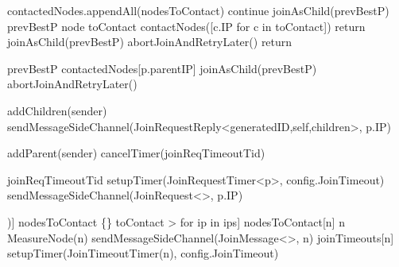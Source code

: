 \begin{algorithm}{}
\begin{algorithmic}[1]
 \label{alg:memb:join:cond_go}
    \State contactedNodes.appendAll(nodesToContact)
         \label{alg:memb:join:verif_children}
            \State continue 
        \EndIf
         \label{alg:memb:join:verif_vs_prev}
            \State joinAsChild(prevBestP)
        \Else
            \State prevBestP \asdassign node \label{alg:memb:join:advance}
            \State toContact 
            \State contactNodes([c.IP for c in toContact])
        \EndIf
        \State return
    \EndFor
    {joinAsChild(prevBestP)}  
    {abortJoinAndRetryLater()} \label{alg:memb:join:join_base_case}
    \State return
\asdend

 \label{alg:memb:join:exclusions}
\asdend

            \State prevBestP \asdassign contactedNodes[p.parentIP]
            \State joinAsChild(prevBestP)
        \Else
            \State abortJoinAndRetryLater()
        \EndIf
    \EndIf
\asdend

    \State addChildren(sender) 
    \State sendMessageSideChannel(JoinRequestReply<generatedID,self,children>, p.IP)
\asdend
    
        \State addParent(sender) 
        \State cancelTimer(joinReqTimeoutTid)
    \EndIf
\asdend

    \State joinReqTimeoutTid \asdassign setupTimer(JoinRequestTimer<p>, config.JoinTimeout)
    \State sendMessageSideChannel(JoinRequest<>, p.IP)
\asdend

\asdprocedure[contactNodes(ips : IP[])]
    \State nodesToContact \asdassign \{\}
    \State toContact \asdassign [Node<0,nil,0,false,lIP,false,[]> for ip in ips]
        \State nodesToContact[n] \asdassign n
        \State MeasureNode(n) 
        \State sendMessageSideChannel(JoinMessage<>, n)
        \State joinTimeouts[n] \asdassign \asdassign setupTimer(JoinTimeoutTimer(n), config.JoinTimeout)
    \EndFor
\asdend

\end{algorithmic}
\end{algorithm}

